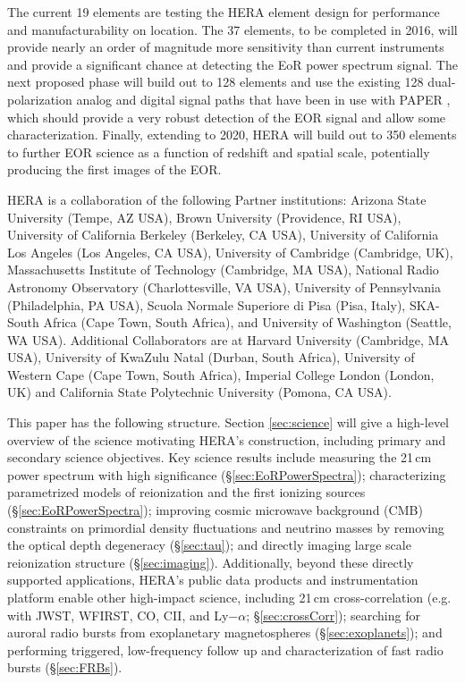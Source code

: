 \documentclass[preprint,11pt]{aastex}
\begin{document}
The current 19 elements are testing the HERA element design for performance and manufacturability on location.  The 37 elements, to be completed in 2016, will provide nearly an order of magnitude more 
sensitivity than current instruments and provide a significant chance at detecting the EoR power spectrum signal.  The next proposed phase will build out to 128 elements and use the existing 128 dual-polarization analog and digital signal paths that have been in use with PAPER \citep{ali_et_al2015}, which should provide a very robust detection of the EOR signal and allow some characterization.  Finally, extending to 2020, HERA will build out to 350 elements to further EOR science as a function 
of redshift and spatial scale, potentially producing the first images of the EOR.

HERA is a collaboration of the following Partner institutions:  
Arizona State University (Tempe, AZ USA), 
Brown University (Providence, RI USA), 
University of California Berkeley (Berkeley, CA USA), 
University of California Los Angeles (Los Angeles, CA USA), 
University of Cambridge (Cambridge, UK), 
Massachusetts Institute of Technology (Cambridge, MA USA), 
National Radio Astronomy Observatory (Charlottesville, VA USA), 
University of Pennsylvania (Philadelphia, PA USA), 
Scuola Normale Superiore di Pisa (Pisa, Italy),
SKA-South Africa (Cape Town, South Africa), and
University of Washington (Seattle, WA USA).  
Additional Collaborators are at 
Harvard University (Cambridge, MA USA),  
University of KwaZulu Natal (Durban, South Africa), 
University of Western Cape (Cape Town, South Africa), 
Imperial College London  (London, UK) and 
California State Polytechnic University (Pomona, CA USA).

This paper has the following structure.  Section \ref{sec:science} will give a high-level overview of the science motivating HERA's construction, including primary and secondary science objectives.  Key science results include
measuring the 21\,cm power spectrum with high significance (\S\ref{sec:EoRPowerSpectra});
characterizing parametrized models of reionization and the first ionizing sources (\S\ref{sec:EoRPowerSpectra});
improving cosmic microwave background (CMB) constraints on primordial density fluctuations and neutrino masses by removing the optical depth degeneracy (\S\ref{sec:tau}); and
directly imaging large scale reionization structure (\S\ref{sec:imaging}).
Additionally, beyond these directly supported applications, HERA's public data products and instrumentation platform enable other high-impact science, including 
21\,cm cross-correlation (e.g. with JWST, WFIRST, CO, CII, and Ly$-\alpha$; \S\ref{sec:crossCorr});
searching for auroral radio bursts from exoplanetary magnetospheres (\S\ref{sec:exoplanets}); and
performing triggered, low-frequency follow up and characterization of fast radio bursts (\S\ref{sec:FRBs}).
\end{document}
